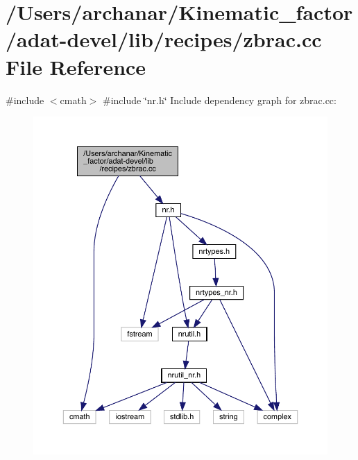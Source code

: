 \hypertarget{adat-devel_2lib_2recipes_2zbrac_8cc}{}\section{/\+Users/archanar/\+Kinematic\+\_\+factor/adat-\/devel/lib/recipes/zbrac.cc File Reference}
\label{adat-devel_2lib_2recipes_2zbrac_8cc}
{\ttfamily \#include $<$cmath$>$}\newline
{\ttfamily \#include \char`\"{}nr.\+h\char`\"{}}\newline
Include dependency graph for zbrac.\+cc\+:
\nopagebreak
\begin{figure}[H]
\begin{center}
\leavevmode
\includegraphics[width=350pt]{d3/d53/adat-devel_2lib_2recipes_2zbrac_8cc__incl}
\end{center}
\end{figure}
